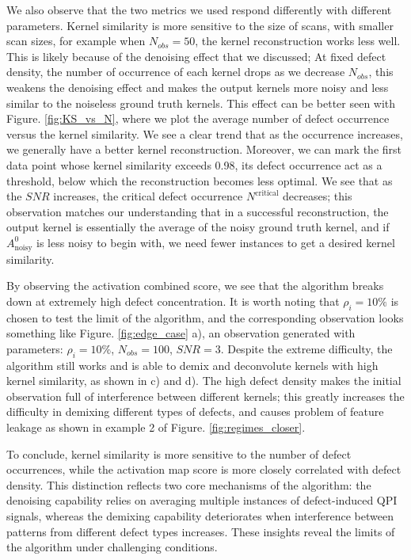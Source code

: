 We also observe that the two metrics we used respond differently with different parameters. Kernel similarity is more sensitive to the size of scans, with smaller scan sizes, for example when $N_{obs} = 50$, the kernel reconstruction works less well. This is likely because of the denoising effect that we discussed; At fixed defect density, the number of occurrence of each kernel drops as we decrease $N_{obs}$, this weakens the denoising effect and makes the output kernels more noisy and less similar to the noiseless ground truth kernels. This effect can be better seen with Figure. \ref{fig:KS_vs_N}, where we plot the average number of defect occurrence versus the kernel similarity. We see a clear trend that as the occurrence increases, we generally have a better kernel reconstruction. Moreover, we can mark the first data point whose kernel similarity exceeds 0.98, its defect occurrence act as a threshold, below which the reconstruction becomes less optimal. We see that as the $SNR$ increases, the critical defect occurrence $N^{\text{critical}}$ decreases; this observation matches our understanding that in a successful reconstruction, the output kernel is essentially the average of the noisy ground truth kernel, and if $A^0_{\text{noisy}}$ is less noisy to begin with, we need fewer instances to get a desired kernel similarity.   

By observing the activation combined score, we see that the algorithm breaks down at extremely high defect concentration. It is worth noting that $\rho_i = 10\%$ is chosen to test the limit of the algorithm, and the corresponding observation looks something like Figure. \ref{fig:edge_case} a), an observation generated with parameters: $\rho_i = 10\%$, $N_{obs}=100$, $SNR=3$. Despite the extreme difficulty, the algorithm still works and is able to demix and deconvolute kernels with high kernel similarity, as shown in c) and d). The high defect density makes the initial observation full of interference between different kernels; this greatly increases the difficulty in demixing different types of defects, and causes problem of feature leakage as shown in example 2 of Figure. \ref{fig:regimes_closer}.  

To conclude, kernel similarity is more sensitive to the number of defect occurrences, while the activation map score is more closely correlated with defect density. This distinction reflects two core mechanisms of the algorithm: the denoising capability relies on averaging multiple instances of defect-induced QPI signals, whereas the demixing capability deteriorates when interference between patterns from different defect types increases. These insights reveal the limits of the algorithm under challenging conditions.

